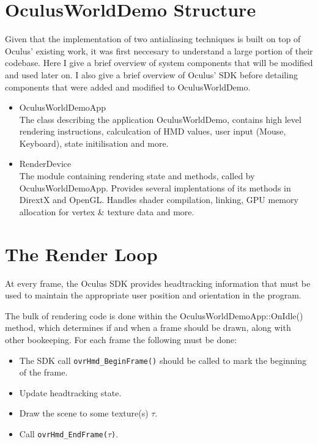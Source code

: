 \documentclass[12pt,a4paper,twoside,openright]{report}
\begin{document}
\section{OculusWorldDemo Structure}

Given that the implementation of two antialiasing techniques is built on top of Oculus' existing work, it was first neccesary to understand a large portion of their codebase.
Here I give a brief overview of system components that will be modified and used later on. I also give a brief overview of Oculus' SDK before detailing components that were added and modified to OculusWorldDemo.

\begin{itemize}
\item OculusWorldDemoApp \\
  The class describing the application OculusWorldDemo, contains high level rendering instructions, calculcation of HMD values, user input (Mouse, Keyboard), state initilisation and more.

\item RenderDevice \\
  The module containing rendering state and methods, called by OculusWorldDemoApp. Provides several implentations of its methods in DirextX and OpenGL. Handles shader compilation, linking, GPU memory allocation for vertex \& texture data and more.

\end{itemize}
\section{The Render Loop}
At every frame, the Oculus SDK provides headtracking information that must be used to maintain the appropriate user position and orientation in the program.

The bulk of rendering code is done within the OculusWorldDemoApp::OnIdle() method, which determines if and when a frame should be drawn, along with other bookeeping.
For each frame the following must be done:

\begin{itemize}
  \item The SDK call \texttt{ovrHmd\_BeginFrame()} should be called to mark the beginning of the frame.
  \item Update headtracking state.
  \item Draw the scene to some texture(s) $\tau$.
  \item Call \texttt{ovrHmd\_EndFrame($\tau$)}.
\end{itemize}
\end{document}

